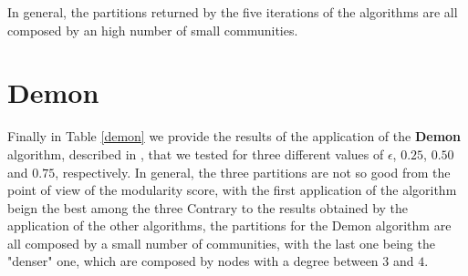     In general, the partitions returned by the five iterations of the algorithms are all composed by an high number
    of small communities.


\section{Demon} %
\label{sec:demon}
    Finally in Table \ref{demon} we provide the results of the application of the \textbf{Demon} algorithm,
    described in \cite{demon}, that we tested for three different values of $\epsilon$, $0.25$, $0.50$ and $0.75$,
    respectively. In general, the three partitions are not so good from the point of view of the modularity score,
    with the first application of the algorithm beign the best among the three
    Contrary to the results obtained by the application of the other algorithms, the partitions for the Demon
    algorithm are all composed by a small number of communities, with the last one being the "denser" one, which
    are composed by nodes with a degree between $3$ and $4$.

    \begin{table}[H]
        \centering
        \begin{subtable}{\textwidth}
        \end{subtable}
        \caption{Evaluation of the partition obtained by the application of the Demon algorithm.}
        \label{demon}
    \end{table}

